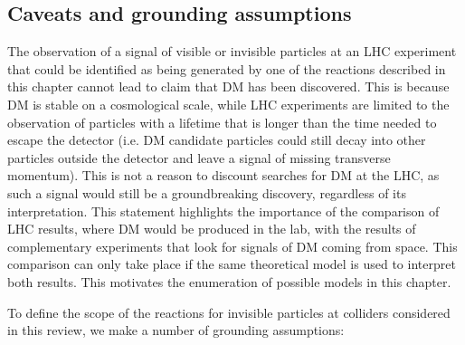 \subsection{Caveats and grounding assumptions}
\label{sec:GroundingAssumptions}

The observation of a signal of visible or invisible particles at an LHC experiment that could be identified as being generated by one of the reactions described in this chapter cannot lead to claim that DM has been discovered. This is because DM is stable on a cosmological scale, while LHC experiments are limited to the observation of particles with a lifetime that is longer than the time needed to escape the detector (i.e. DM candidate particles could still decay into other particles outside the detector and leave a signal of missing transverse momentum). This is not a reason to discount searches for DM at the LHC, as such a signal would still be a groundbreaking discovery, regardless of its interpretation. This statement highlights the importance of the comparison of LHC results, where DM would be produced in the lab, with the results of complementary experiments that look for signals of DM coming from space. This comparison can only take place if the same theoretical model is used to interpret both results. This motivates the enumeration of possible models in this chapter. 

To define the scope of the reactions for invisible particles at colliders considered in this review, we make a number of grounding assumptions: 

